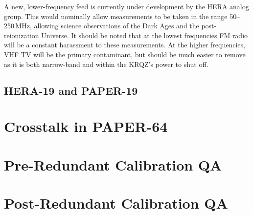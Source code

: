 A new, lower-frequency feed is currently under development by the HERA analog group. This would nominally allow measurements to be taken in the range 50--250\,MHz, allowing science observations of the Dark Ages and the post-reionization Universe. It should be noted that at the lowest frequencies FM radio will be a constant harassment to these measurements. At the higher frequencies, VHF TV will be the primary contaminant, but should be much easier to remove as it is both narrow-band and within the KRQZ's power to shut off.

\subsection{HERA-19 and PAPER-19}
\label{subsec:rfi_hera19paper19}

\section{Crosstalk in PAPER-64}

\section{Pre-Redundant Calibration QA}

\section{Post-Redundant Calibration QA}
